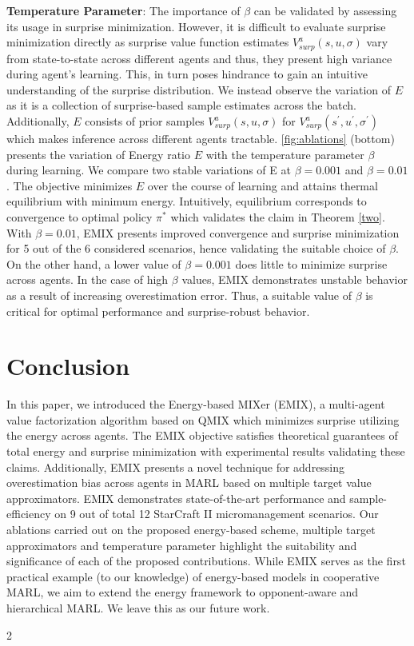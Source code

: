 \documentclass{article}
\begin{document}
\begin{multicols}{2}
\textbf{Temperature Parameter}: The importance of $\beta$ can be validated by assessing its usage in surprise minimization. However, it is difficult to evaluate surprise minimization directly as surprise value function estimates $V_{surp}^{a}(s,u,\sigma)$ vary from state-to-state across different agents and thus, they present high variance during agent's learning. This, in turn poses hindrance to gain an intuitive understanding of the surprise distribution. We instead observe the variation of $E$ as it is a collection of surprise-based sample estimates across the batch. Additionally, $E$ consists of prior samples $V_{surp}^{a}(s,u,\sigma)$ for $V_{surp}^{a}(s^{'},u^{'},\sigma^{'})$ which makes inference across different agents tractable. \autoref{fig:ablations} (bottom) presents the variation of Energy ratio $E$ with the temperature parameter $\beta$ during learning. We compare two stable variations of E at $\beta=0.001$ and $\beta=0.01$. The objective minimizes $E$ over the course of learning and attains thermal equilibrium with minimum energy. Intuitively, equilibrium corresponds to convergence to optimal policy $\pi^{*}$ which validates the claim in Theorem \autoref{two}. With $\beta=0.01$, EMIX presents improved convergence and surprise minimization for 5 out of the 6 considered scenarios, hence validating the suitable choice of $\beta$. On the other hand, a lower value of $\beta=0.001$ does little to minimize surprise across agents. In the case of high $\beta$ values, EMIX demonstrates unstable behavior as a result of increasing overestimation error. Thus, a suitable value of $\beta$ is critical for optimal performance and surprise-robust behavior. 


\section{Conclusion}
In this paper, we introduced the Energy-based MIXer (EMIX), a multi-agent value factorization algorithm based on QMIX which minimizes surprise utilizing the energy across agents. The EMIX objective satisfies theoretical guarantees of total energy and surprise minimization with experimental results validating these claims. Additionally, EMIX presents a novel technique for addressing overestimation bias across agents in MARL based on multiple target value approximators. EMIX demonstrates state-of-the-art performance and sample-efficiency on 9 out of total 12 StarCraft II micromanagement scenarios. Our ablations carried out on the proposed energy-based scheme, multiple target approximators and temperature parameter highlight the suitability and significance of each of the proposed contributions. While EMIX serves as the first practical example (to our knowledge) of energy-based models in cooperative MARL, we aim to extend the energy framework to opponent-aware and hierarchical MARL. We leave this as our future work. 

 
\small{}
\end{multicols}{2}
\end{document}
